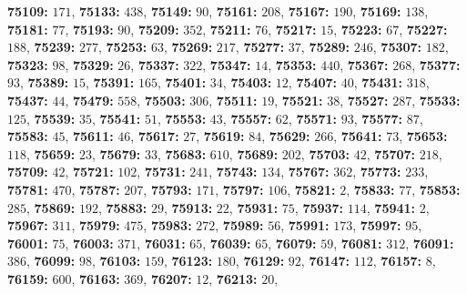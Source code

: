 \textsf{\bfseries 75109:} $171$, \textsf{\bfseries 75133:} $438$, \textsf{\bfseries 75149:} $90$, \textsf{\bfseries 75161:} $208$, \textsf{\bfseries 75167:} $190$, \textsf{\bfseries 75169:} $138$, \textsf{\bfseries 75181:} $77$, \textsf{\bfseries 75193:} $90$, \textsf{\bfseries 75209:} $352$, \textsf{\bfseries 75211:} $76$, \textsf{\bfseries 75217:} $15$, \textsf{\bfseries 75223:} $67$, \textsf{\bfseries 75227:} $188$, \textsf{\bfseries 75239:} $277$, \textsf{\bfseries 75253:} $63$, \textsf{\bfseries 75269:} $217$, \textsf{\bfseries 75277:} $37$, \textsf{\bfseries 75289:} $246$, \textsf{\bfseries 75307:} $182$, \textsf{\bfseries 75323:} $98$, \textsf{\bfseries 75329:} $26$, \textsf{\bfseries 75337:} $322$, \textsf{\bfseries 75347:} $14$, \textsf{\bfseries 75353:} $440$, \textsf{\bfseries 75367:} $268$, \textsf{\bfseries 75377:} $93$, \textsf{\bfseries 75389:} $15$, \textsf{\bfseries 75391:} $165$, \textsf{\bfseries 75401:} $34$, \textsf{\bfseries 75403:} $12$, \textsf{\bfseries 75407:} $40$, \textsf{\bfseries 75431:} $318$, \textsf{\bfseries 75437:} $44$, \textsf{\bfseries 75479:} $558$, \textsf{\bfseries 75503:} $306$, \textsf{\bfseries 75511:} $19$, \textsf{\bfseries 75521:} $38$, \textsf{\bfseries 75527:} $287$, \textsf{\bfseries 75533:} $125$, \textsf{\bfseries 75539:} $35$, \textsf{\bfseries 75541:} $51$, \textsf{\bfseries 75553:} $43$, \textsf{\bfseries 75557:} $62$, \textsf{\bfseries 75571:} $93$, \textsf{\bfseries 75577:} $87$, \textsf{\bfseries 75583:} $45$, \textsf{\bfseries 75611:} $46$, \textsf{\bfseries 75617:} $27$, \textsf{\bfseries 75619:} $84$, \textsf{\bfseries 75629:} $266$, \textsf{\bfseries 75641:} $73$, \textsf{\bfseries 75653:} $118$, \textsf{\bfseries 75659:} $23$, \textsf{\bfseries 75679:} $33$, \textsf{\bfseries 75683:} $610$, \textsf{\bfseries 75689:} $202$, \textsf{\bfseries 75703:} $42$, \textsf{\bfseries 75707:} $218$, \textsf{\bfseries 75709:} $42$, \textsf{\bfseries 75721:} $102$, \textsf{\bfseries 75731:} $241$, \textsf{\bfseries 75743:} $134$, \textsf{\bfseries 75767:} $362$, \textsf{\bfseries 75773:} $233$, \textsf{\bfseries 75781:} $470$, \textsf{\bfseries 75787:} $207$, \textsf{\bfseries 75793:} $171$, \textsf{\bfseries 75797:} $106$, \textsf{\bfseries 75821:} $2$, \textsf{\bfseries 75833:} $77$, \textsf{\bfseries 75853:} $285$, \textsf{\bfseries 75869:} $192$, \textsf{\bfseries 75883:} $29$, \textsf{\bfseries 75913:} $22$, \textsf{\bfseries 75931:} $75$, \textsf{\bfseries 75937:} $114$, \textsf{\bfseries 75941:} $2$, \textsf{\bfseries 75967:} $311$, \textsf{\bfseries 75979:} $475$, \textsf{\bfseries 75983:} $272$, \textsf{\bfseries 75989:} $56$, \textsf{\bfseries 75991:} $173$, \textsf{\bfseries 75997:} $95$, \textsf{\bfseries 76001:} $75$, \textsf{\bfseries 76003:} $371$, \textsf{\bfseries 76031:} $65$, \textsf{\bfseries 76039:} $65$, \textsf{\bfseries 76079:} $59$, \textsf{\bfseries 76081:} $312$, \textsf{\bfseries 76091:} $386$, \textsf{\bfseries 76099:} $98$, \textsf{\bfseries 76103:} $159$, \textsf{\bfseries 76123:} $180$, \textsf{\bfseries 76129:} $92$, \textsf{\bfseries 76147:} $112$, \textsf{\bfseries 76157:} $8$, \textsf{\bfseries 76159:} $600$, \textsf{\bfseries 76163:} $369$, \textsf{\bfseries 76207:} $12$, \textsf{\bfseries 76213:} $20$, 
